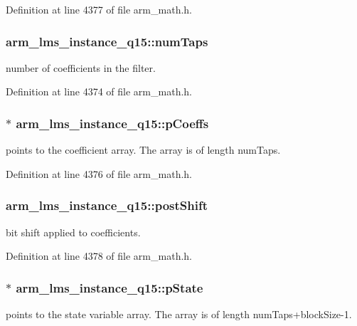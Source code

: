 Definition at line 4377 of file arm\-\_\-math.\-h.

\hypertarget{structarm__lms__instance__q15_a0078e894f805af1b360369e619fb57b3}{
\subsubsection[{num\-Taps}]{ arm\-\_\-lms\-\_\-instance\-\_\-q15\-::num\-Taps}}\label{structarm__lms__instance__q15_a0078e894f805af1b360369e619fb57b3}
number of coefficients in the filter. 

Definition at line 4374 of file arm\-\_\-math.\-h.

\hypertarget{structarm__lms__instance__q15_a42f95368b94898eb82608e1113d18cab}{
\subsubsection[{p\-Coeffs}]{$\ast$ arm\-\_\-lms\-\_\-instance\-\_\-q15\-::p\-Coeffs}}\label{structarm__lms__instance__q15_a42f95368b94898eb82608e1113d18cab}
points to the coefficient array. The array is of length num\-Taps. 

Definition at line 4376 of file arm\-\_\-math.\-h.

\hypertarget{structarm__lms__instance__q15_acca5fbaef4a52ae411de24c9a0b929cf}{
\subsubsection[{post\-Shift}]{ arm\-\_\-lms\-\_\-instance\-\_\-q15\-::post\-Shift}}\label{structarm__lms__instance__q15_acca5fbaef4a52ae411de24c9a0b929cf}
bit shift applied to coefficients. 

Definition at line 4378 of file arm\-\_\-math.\-h.

\hypertarget{structarm__lms__instance__q15_a9a575ff82c1e68cbb583083439260d08}{
\subsubsection[{p\-State}]{$\ast$ arm\-\_\-lms\-\_\-instance\-\_\-q15\-::p\-State}}\label{structarm__lms__instance__q15_a9a575ff82c1e68cbb583083439260d08}
points to the state variable array. The array is of length num\-Taps+block\-Size-\/1. 

